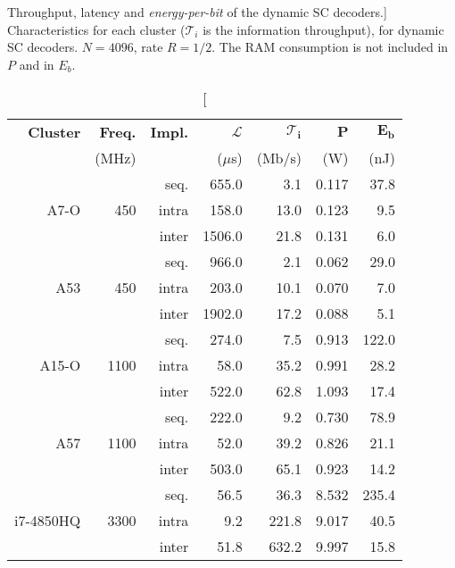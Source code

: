 \begin{table}[htp]
  \centering
  \caption
    [Throughput, latency and \emph{energy-per-bit} of the dynamic SC decoders.]
    {Characteristics for each cluster ($\mathcal{T}_i$ is the information
    throughput), for dynamic SC decoders. $N = 4096$, rate $R = 1/2$. The RAM
    consumption is not included in $P$ and in $E_b$.}
  \label{tab:eval_polar_energy_results}
  \begin{tabular}{r r r r r r r}
    \textbf{Cluster} & \textbf{Freq.} & \textbf{Impl.} & $\bm{\mathcal{L}}$ & $\bm{\mathcal{T}_i}$ & $\bm{P}$ & $\boldsymbol{E_b}$ \\
                     &          (MHz) &                &          ($\mu$s)  &               (Mb/s) &      (W) &               (nJ) \\
    \hline
    \hline
    \multirow{3}{*}{A7-O}      & \multirow{3}{*}{ 450} & seq.  &  655.0 &   3.1 & 0.117 &  37.8 \\
                               &                       & intra &  158.0 &  13.0 & 0.123 &   9.5 \\
                               &                       & inter & 1506.0 &  21.8 & 0.131 &   6.0 \\
    \hline
    \multirow{3}{*}{A53}       & \multirow{3}{*}{ 450} & seq.  &  966.0 &   2.1 & 0.062 &  29.0 \\
                               &                       & intra &  203.0 &  10.1 & 0.070 &   7.0 \\
                               &                       & inter & 1902.0 &  17.2 & 0.088 &   5.1 \\
    \hline
    \multirow{3}{*}{A15-O}     & \multirow{3}{*}{1100} & seq.  &  274.0 &   7.5 & 0.913 & 122.0 \\
                               &                       & intra &   58.0 &  35.2 & 0.991 &  28.2 \\
                               &                       & inter &  522.0 &  62.8 & 1.093 &  17.4 \\
    \hline
    \multirow{3}{*}{A57}       & \multirow{3}{*}{1100} & seq.  &  222.0 &   9.2 & 0.730 &  78.9 \\
                               &                       & intra &   52.0 &  39.2 & 0.826 &  21.1 \\
                               &                       & inter &  503.0 &  65.1 & 0.923 &  14.2 \\
    \hline
    \multirow{3}{*}{i7-4850HQ} & \multirow{3}{*}{3300} & seq.  &   56.5 &  36.3 & 8.532 & 235.4 \\
                               &                       & intra &    9.2 & 221.8 & 9.017 &  40.5 \\
                               &                       & inter &   51.8 & 632.2 & 9.997 &  15.8 \\
  \end{tabular}
\end{table}

